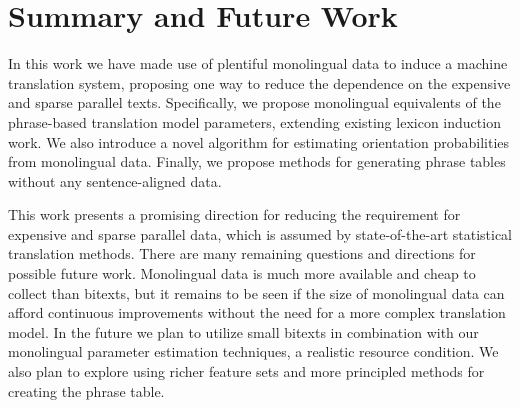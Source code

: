 \documentclass[11pt]{article}
\begin{document}





\section{Summary and Future Work} \label{sect:conc}



In this work we have made use of plentiful monolingual data to induce a machine translation system, proposing one way to reduce the dependence on the expensive and sparse parallel texts.  Specifically, we propose monolingual equivalents of the phrase-based translation model parameters, extending existing lexicon induction work.  We also introduce a novel algorithm for estimating orientation probabilities from monolingual data.  Finally, we propose methods for generating phrase tables without any sentence-aligned data.

This work presents a promising direction for reducing the requirement for expensive and sparse parallel data, which is assumed by state-of-the-art statistical translation methods.  There are many remaining questions and directions for possible future work.  Monolingual data is much more available and cheap to collect than bitexts, but it remains to be seen if the size of monolingual data can afford continuous improvements without the need for a more complex translation model. In the future we plan to utilize small bitexts in combination with our monolingual parameter estimation techniques, a realistic resource condition. We also plan to explore using richer feature sets and more principled methods for creating the phrase table.
\end{document}

